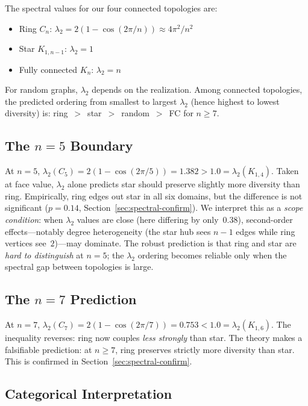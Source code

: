 \documentclass[submission,copyright,creativecommons]{eptcs}
\begin{document}
The spectral values for our four connected topologies are:
\begin{itemize}
\item Ring $C_n$: $\lambda_2 = 2(1 - \cos(2\pi/n)) \approx 4\pi^2/n^2$
\item Star $K_{1,n-1}$: $\lambda_2 = 1$
\item Fully connected $K_n$: $\lambda_2 = n$
\end{itemize}
For random graphs, $\lambda_2$ depends on the realization.
Among connected topologies, the predicted ordering from smallest to
largest $\lambda_2$ (hence highest to lowest diversity) is:
ring~$>$~star~$>$~random~$>$~FC for $n \geq 7$.

\subsection{The \texorpdfstring{$n{=}5$}{n=5} Boundary}

At $n{=}5$, $\lambda_2(C_5) = 2(1 - \cos(2\pi/5)) = 1.382 > 1.0 =
\lambda_2(K_{1,4})$. Taken at face value, $\lambda_2$ alone
predicts star should preserve slightly more diversity than ring.
Empirically, ring edges out star in all six domains, but the
difference is not significant ($p = 0.14$, Section~\ref{sec:spectral-confirm}).
We interpret this as a \emph{scope condition}: when $\lambda_2$
values are close (here differing by only~$0.38$), second-order
effects---notably degree heterogeneity (the star hub sees $n{-}1$
edges while ring vertices see~$2$)---may dominate.
The robust prediction is that ring and star are
\emph{hard to distinguish} at $n{=}5$; the $\lambda_2$ ordering
becomes reliable only when the spectral gap between topologies
is large.

\subsection{The \texorpdfstring{$n{=}7$}{n=7} Prediction}

At $n{=}7$, $\lambda_2(C_7) = 2(1 - \cos(2\pi/7)) = 0.753 < 1.0 =
\lambda_2(K_{1,6})$. The inequality reverses: ring now couples
\emph{less strongly} than star. The theory makes a falsifiable
prediction: at $n \geq 7$, ring preserves strictly more diversity
than star. This is confirmed in Section~\ref{sec:spectral-confirm}.

\subsection{Categorical Interpretation}
\end{document}
